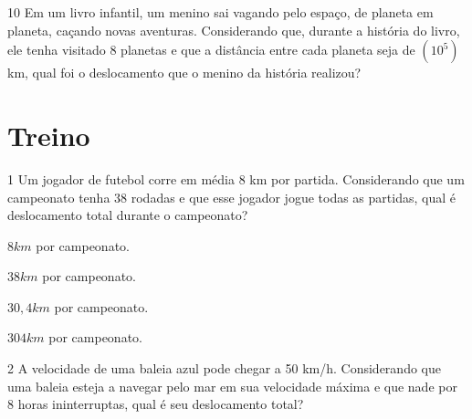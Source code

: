 \num{10} Em um livro infantil, um menino sai vagando pelo espaço, de planeta
em planeta, caçando novas aventuras. Considerando que, durante a
história do livro, ele tenha visitado 8 planetas e que a distância
entre cada planeta seja de $(10^5)$ km, qual foi o deslocamento que o
menino da história realizou?





\section*{Treino}

\num{1} Um jogador de futebol corre em média 8 km por partida. Considerando
que um campeonato tenha 38 rodadas e que esse jogador jogue todas as
partidas, qual é deslocamento total durante o campeonato?

\begin{escolha}[itemsep=0pt]
\item $8 km$ por campeonato.
\item $38 km$ por campeonato.
\item $30,4 km$ por campeonato.
\item $304 km$ por campeonato.
\end{escolha}







\num{2} A velocidade de uma baleia azul pode chegar a 50 km/h. Considerando
que uma baleia esteja a navegar pelo mar em sua velocidade máxima e que
nade por 8 horas ininterruptas, qual é seu deslocamento total?

